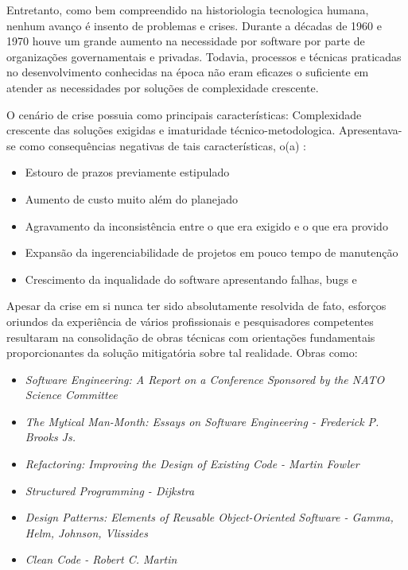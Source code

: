     Entretanto, como bem compreendido na historiologia tecnologica humana, nenhum
    avanço é insento de problemas e crises. Durante a décadas de 1960 e 1970 houve um grande aumento
    na necessidade por software por parte de organizações governamentais e privadas. Todavia,
    processos e técnicas praticadas no desenvolvimento conhecidas na época não eram eficazes
    o suficiente em atender as necessidades por soluções de complexidade crescente.
 
    O cenário de crise possuia como principais características: Complexidade crescente das
    soluções exigidas e imaturidade técnico-metodologica. Apresentava-se
    como consequências negativas de tais características, o(a) :

    \begin{itemize}
      \item{ Estouro de prazos previamente estipulado }
      \item{ Aumento de custo muito além do planejado }
      \item{ Agravamento da inconsistência entre o que era exigido e o que era provido }
      \item{ Expansão da ingerenciabilidade de projetos em pouco tempo de manutenção }
      \item{ Crescimento da inqualidade do software apresentando falhas, bugs e  }
    \end{itemize}

    Apesar da crise em si nunca ter sido absolutamente resolvida de fato, esforços oriundos da experiência
    de vários profissionais e pesquisadores competentes resultaram na consolidação de obras técnicas com orientações
    fundamentais proporcionantes da solução mitigatória sobre tal realidade. Obras como: 

    \begin{itemize}
      \item{ \textit{Software Engineering: A Report on a Conference Sponsored by the NATO Science Committee} }
      \item{ \textit{The Mytical Man-Month: Essays on Software Engineering - Frederick P. Brooks Js. } }
      \item{ \textit{Refactoring: Improving the Design of Existing Code - Martin Fowler} }
      \item{ \textit{Structured Programming - Dijkstra} }
      \item{ \textit{Design Patterns: Elements of Reusable Object-Oriented Software - Gamma, Helm, Johnson, Vlissides} }
      \item{ \textit{Clean Code - Robert C. Martin} }
    \end{itemize}

